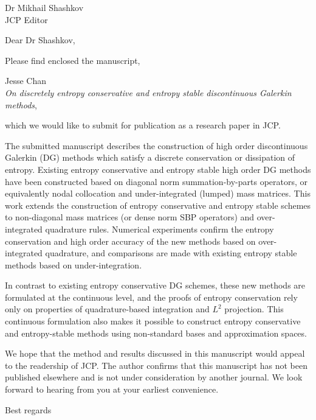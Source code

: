 \documentclass{letter}
\begin{document}
\begin{letter}{Dr Mikhail Shashkov\\JCP Editor}


\opening{Dear Dr Shashkov,}

Please find enclosed the manuscript, 
\begin{center}
Jesse Chan\\
\textit{On discretely entropy conservative and entropy stable discontinuous Galerkin methods},
\end{center}
which we would like to submit for publication as a research paper in JCP.  

The submitted manuscript describes the construction of high order discontinuous Galerkin (DG) methods which satisfy a discrete conservation or dissipation of entropy.  Existing entropy conservative and entropy stable high order DG methods have been constructed based on diagonal norm summation-by-parts operators, or equivalently nodal collocation and under-integrated (lumped) mass matrices.  This work extends the construction of entropy conservative and entropy stable schemes to non-diagonal mass matrices (or dense norm SBP operators) and over-integrated quadrature rules.  Numerical experiments confirm the entropy conservation and high order accuracy of the new methods based on over-integrated quadrature, and comparisons are made with existing entropy stable methods based on under-integration.  

In contrast to existing entropy conservative DG schemes, these new methods are formulated at the continuous level, and the proofs of entropy conservation rely only on properties of quadrature-based integration and $L^2$ projection.  This continuous formulation also makes it possible to construct entropy conservative and entropy-stable methods using non-standard bases and approximation spaces.  

We hope that the method and results discussed in this manuscript would appeal to the readership of JCP.  The author confirms that this manuscript has not been published elsewhere and is not under consideration by another journal.  We look forward to hearing from you at your earliest convenience.  

\closing{Best regards}

\end{letter}
\end{document}
